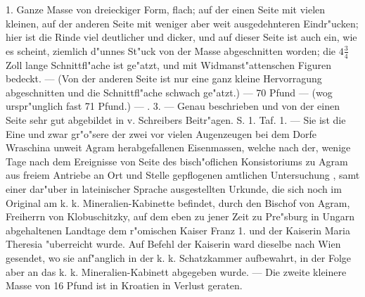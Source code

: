 \documentclass[a4paper, 11pt, oneside, polutonikogreek, german]{article}
\begin{document}
1. Ganze Masse von dreieckiger Form, flach; auf der einen Seite mit vielen kleinen, auf der anderen Seite mit weniger aber weit ausgedehnteren Eindr"ucken; hier ist die Rinde viel deutlicher und dicker, und auf dieser Seite ist auch ein, wie es scheint, ziemlich d"unnes St"uck von der Masse abgeschnitten worden; die $4\frac{3}{4}$ Zoll lange Schnittfl"ache ist ge"atzt, und mit Widmanst"attenschen Figuren bedeckt. --- (Von der anderen Seite ist nur eine ganz kleine Hervorragung abgeschnitten und die Schnittfl"ache schwach ge"atzt.) --- 70 Pfund --- (wog urspr"unglich fast 71 Pfund.) --- . 3. --- Genau beschrieben und von der einen Seite sehr gut abgebildet in v. Schreibers Beitr"agen. S. 1. Taf. 1. --- Sie ist die Eine und zwar gr"o"sere der zwei vor vielen Augenzeugen bei dem Dorfe Wraschina unweit Agram herabgefallenen Eisenmassen, welche nach der, wenige Tage nach dem Ereignisse von Seite des bisch"oflichen Konsistoriums zu Agram aus freiem Antriebe an Ort und Stelle gepflogenen amtlichen Untersuchung , samt einer dar"uber in lateinischer Sprache ausgestellten Urkunde, die sich noch im Original am k. k. Mineralien-Kabinette befindet, durch den Bischof von Agram, Freiherrn von Klobuschitzky, auf dem eben zu jener Zeit zu Pre"sburg in Ungarn abgehaltenen Landtage dem r"omischen Kaiser Franz 1. und der Kaiserin Maria Theresia "uberreicht wurde. Auf Befehl der Kaiserin ward dieselbe nach Wien gesendet, wo sie anf"anglich in der k. k. Schatzkammer aufbewahrt, in der Folge aber an das k. k. Mineralien-Kabinett abgegeben wurde. --- Die zweite kleinere Masse von 16 Pfund ist in Kroatien in Verlust geraten.

\setlength{\leftskip}{10mm}
\setlength{\parindent}{0pt}
\end{document}
